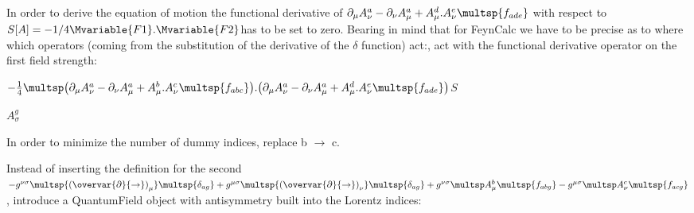 

In order to derive the equation of motion the functional derivative of \({{\partial }_{\mu }}A_{\nu }^{a}-{{\partial }_{\nu }}A_{\mu }^{a}+A_{\mu
}^{d}.A_{\nu }^{e}\multsp {f_{ade}}\) with respect to \(S[A]=-1/4\Mvariable{F1}.\Mvariable{F2}\)has to be set to zero. Bearing in mind that for FeynCalc
we have to be precise as to where which operators (coming from the substitution
  of the derivative of the \(\delta \) function) act:, act with the functional derivative operator on the first field strength:

\(-\frac{1}{4}\multsp \big({{\partial }_{\mu }}A_{\nu }^{a}-{{\partial }_{\nu }}A_{\mu }^{a}+A_{\mu }^{b}.A_{\nu }^{c}\multsp {f_{abc}}
     \big).\big({{\partial }_{\mu }}A_{\nu }^{a}-{{\partial }_{\nu }}A_{\mu }^{a}+A_{\mu }^{d}.A_{\nu }^{e}\multsp {f_{ade}}\big)\)\(S\)

\(A_{\sigma }^{g}\)





In order to minimize the number of dummy indices, replace b \(\rightarrow \) c.



Instead of inserting the definition for the second \(-{g^{\nu \sigma }}\multsp {{\left( \overvar{\partial }{\rightarrow } \right) }_{\mu }}\multsp
{{\delta }_{ag}}+
   {g^{\mu \sigma }}\multsp {{\left( \overvar{\partial }{\rightarrow } \right) }_{\nu }}\multsp {{\delta }_{ag}}+
   {g^{\nu \sigma }}\multsp A_{\mu }^{b}\multsp {f_{abg}}-{g^{\mu \sigma }}\multsp A_{\nu }^{c}\multsp {f_{acg}}\), introduce a QuantumField object
with antisymmetry built into the Lorentz indices:

